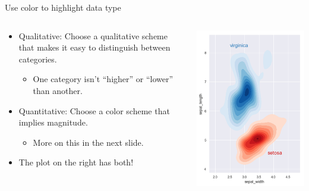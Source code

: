 \documentclass[aspectratio=169]{../latex_main/tntbeamer}  %
\begin{document}
	
	\begin{frame}{Use color to highlight data type}
	    \begin{columns}
	        \begin{column}{.7\textwidth}
	        
	                \begin{itemize}
	                    \item Qualitative: Choose a qualitative scheme that makes it easy to distinguish between categories.
	                    \begin{itemize}
	                        \item One category isn’t “higher” or “lower” than another.
	                    \end{itemize}
	                    \item Quantitative: Choose a color scheme that implies magnitude.
	                    \begin{itemize}
	                        \item More on this in the next slide.
	                    \end{itemize}
	                    \item The plot on the right has both!
	                \end{itemize}
	        \end{column}
	        
	        
	        \begin{column}{.4\textwidth}

	                    \centering
	                    \includegraphics[scale=.5]{Bild65}

	        \end{column}
	    \end{columns}
	\end{frame}
	
\end{document}
